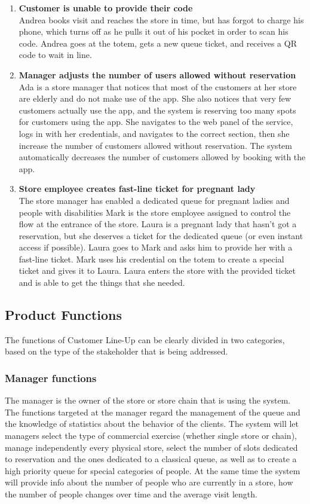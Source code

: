 \begin{enumerate}[label=\Alph*.]
        \item \textbf{Customer is unable to provide their code}\\
            Andrea books visit and reaches the store in time, but has forgot to charge his phone, which turns off as he pulls it out of his pocket in order to scan his code.
            Andrea goes at the totem, gets a new queue ticket, and receives a QR code to wait in line.
        \item \textbf{Manager adjusts the number of users allowed without reservation}\\
            Ada is a store manager that notices that most of the customers at her store are elderly and do not make use of the app. She also notices that very few
            customers actually use the app, and the system is reserving too many spots for customers using the app. She navigates to the web panel of the service,
            logs in with her credentials, and navigates to the correct section, then she increase the number of customers allowed without reservation. The system
            automatically decreases the number of customers allowed by booking with the app.
        \item \textbf{Store employee creates fast-line ticket for pregnant lady}\\
            The store manager has enabled a dedicated queue for pregnant ladies and people with disabilities
            Mark is the store employee assigned to control the flow at the entrance of the store. Laura is a pregnant lady that hasn't got a reservation, but she deserves a ticket for the dedicated queue (or even instant access if possible). Laura goes to Mark and asks him to provide her with a fast-line ticket. Mark uses his credential on the totem to create a special ticket and gives it to Laura. Laura enters the store with the provided ticket and is able to get the things that she needed.         
        \end{enumerate}
\subsection{Product Functions}
The functions of Customer Line-Up can be clearly divided in two categories, based on the type of the stakeholder that is being addressed.

\subsubsection{Manager functions}
The manager is the owner of the store or store chain that is using the system.
The functions targeted at the manager regard the management of the queue and the knowledge of statistics about the behavior of the clients.
The system will let managers select the type of commercial exercise (whether single store or chain), manage independently every physical store, select the number of slots dedicated to reservation and the ones dedicated to a classical queue, as well as to create a high priority queue for special categories of people.
At the same time the system will provide info about the number of people who are currently in a store,
how the number of people changes over time and the average visit length.

